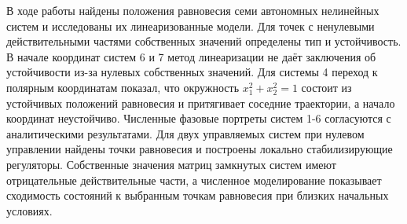 В ходе работы найдены положения равновесия семи автономных нелинейных систем
и исследованы их линеаризованные модели. Для точек с ненулевыми
действительными частями собственных значений определены тип и устойчивость.
В начале координат систем 6 и 7 метод линеаризации не даёт заключения об
устойчивости из-за нулевых собственных значений. Для системы 4 переход к
полярным координатам показал, что окружность $x_1^2+x_2^2=1$ состоит из
устойчивых положений равновесия и притягивает соседние траектории, а начало
координат неустойчиво. Численные фазовые портреты систем 1-6 согласуются
с аналитическими результатами. Для двух управляемых систем при нулевом
управлении найдены точки равновесия и построены локально стабилизирующие
регуляторы. Собственные значения матриц замкнутых систем имеют отрицательные
действительные части, а численное моделирование показывает сходимость
состояний к выбранным точкам равновесия при близких начальных условиях.
